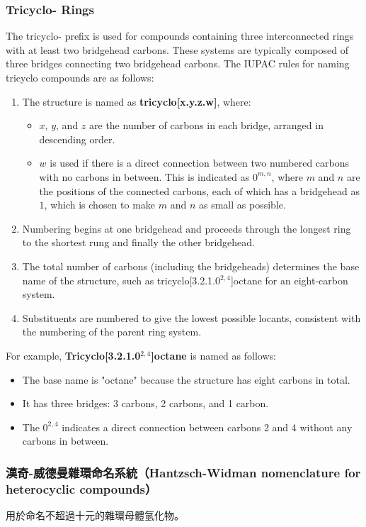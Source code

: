 \documentclass[a4paper,12pt]{report}
\begin{document}
\subsubsection{Tricyclo- Rings}  
The tricyclo- prefix is used for compounds containing three interconnected rings with at least two bridgehead carbons. These systems are typically composed of three bridges connecting two bridgehead carbons. The IUPAC rules for naming tricyclo compounds are as follows:  
\begin{enumerate}  
\item The structure is named as \textbf{tricyclo[x.y.z.w]}, where:  
\begin{itemize}  
\item \( x \), \( y \), and \( z \) are the number of carbons in each bridge, arranged in descending order.  
\item \( w \) is used if there is a direct connection between two numbered carbons with no carbons in between. This is indicated as \( 0^{m,n} \), where \( m \) and \( n \) are the positions of the connected carbons, each of which has a bridgehead as $1$, which is chosen to make $m$ and $n$ as small as possible.
\end{itemize}  
\item Numbering begins at one bridgehead and proceeds through the longest ring to the shortest rung and finally the other bridgehead.
\item The total number of carbons (including the bridgeheads) determines the base name of the structure, such as tricyclo[3.2.1.0$^{2,4}$]octane for an eight-carbon system.  
\item Substituents are numbered to give the lowest possible locants, consistent with the numbering of the parent ring system.  
\end{enumerate}  
\noindent  
For example, \textbf{Tricyclo[3.2.1.0$^{2,4}$]octane} is named as follows:  
\begin{itemize}  
\item The base name is "octane" because the structure has eight carbons in total.  
\item It has three bridges: 3 carbons, 2 carbons, and 1 carbon.  
\item The $0^{2,4}$ indicates a direct connection between carbons 2 and 4 without any carbons in between.  
\end{itemize}
\subsubsection{漢奇-威德曼雜環命名系統（Hantzsch-Widman nomenclature for heterocyclic compounds）}
用於命名不超過十元的雜環母體氫化物。
\end{document}
